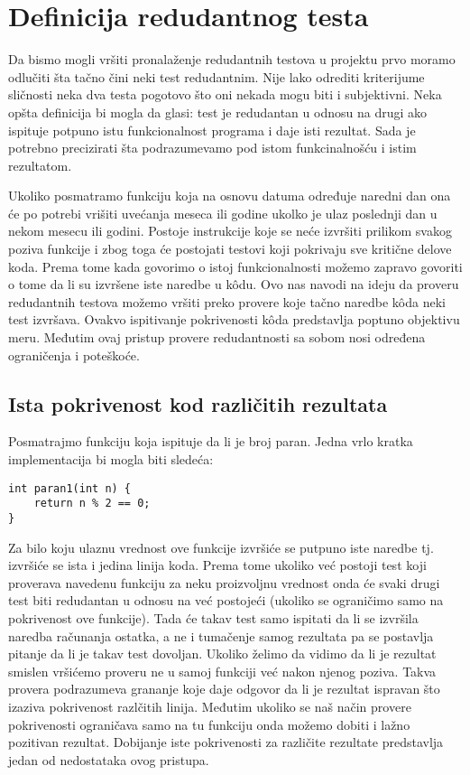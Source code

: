 \documentclass[a4paper]{article}
\begin{document}
\section{Definicija redudantnog testa}
\label{sec:definition}
Da bismo mogli vršiti pronalaženje redudantnih testova u projektu prvo moramo odlučiti šta tačno čini neki test redudantnim. Nije lako odrediti kriterijume sličnosti neka dva testa pogotovo što oni nekada mogu biti i subjektivni. Neka opšta definicija bi mogla da glasi: test je redudantan u odnosu na drugi ako ispituje potpuno istu funkcionalnost programa i daje isti rezultat. Sada je potrebno precizirati šta podrazumevamo pod istom funkcinalnošću i istim rezultatom.

Ukoliko posmatramo funkciju koja na osnovu datuma određuje naredni dan ona će po potrebi vrišiti uvećanja meseca ili godine ukolko je ulaz poslednji dan u nekom mesecu ili godini. Postoje instrukcije koje se neće izvršiti prilikom svakog poziva funkcije i zbog toga će postojati testovi koji pokrivaju sve kritične delove koda. Prema tome kada govorimo o istoj funkcionalnosti možemo zapravo govoriti o tome da li su izvršene iste naredbe u kôdu. Ovo nas navodi na ideju da proveru redudantnih testova možemo vršiti preko provere koje tačno naredbe kôda neki test izvršava. Ovakvo ispitivanje pokrivenosti kôda predstavlja poptuno objektivu meru. Međutim ovaj pristup provere redudantnosti sa sobom nosi određena ograničenja i poteškoće.

\subsection{Ista pokrivenost kod različitih rezultata}

Posmatrajmo funkciju koja ispituje da li je broj paran. Jedna vrlo kratka implementacija bi mogla biti sledeća:

\begin{lstlisting}
int paran1(int n) {
	return n % 2 == 0;
}
\end{lstlisting}

Za bilo koju ulaznu vrednost ove funkcije izvršiće se putpuno iste naredbe tj. izvršiće se ista i jedina linija koda. Prema tome ukoliko već postoji test koji proverava navedenu funkciju za neku proizvoljnu vrednost onda će svaki drugi test biti redudantan u odnosu na već postojeći (ukoliko se ograničimo samo na pokrivenost ove funkcije). Tada će takav test samo ispitati da li se izvršila naredba računanja ostatka, a ne i tumačenje samog rezultata pa se postavlja pitanje da li je takav test dovoljan. Ukoliko želimo da vidimo da li je rezultat smislen vršićemo proveru ne u samoj funkciji već nakon njenog poziva. Takva provera podrazumeva grananje koje daje odgovor da li je rezultat ispravan što izaziva pokrivenost razlčitih linija. Međutim ukoliko se naš način provere pokrivenosti ograničava samo na tu funkciju onda možemo dobiti i lažno pozitivan rezultat. Dobijanje iste pokrivenosti za različite rezultate predstavlja jedan od nedostataka ovog pristupa.
\end{document}
